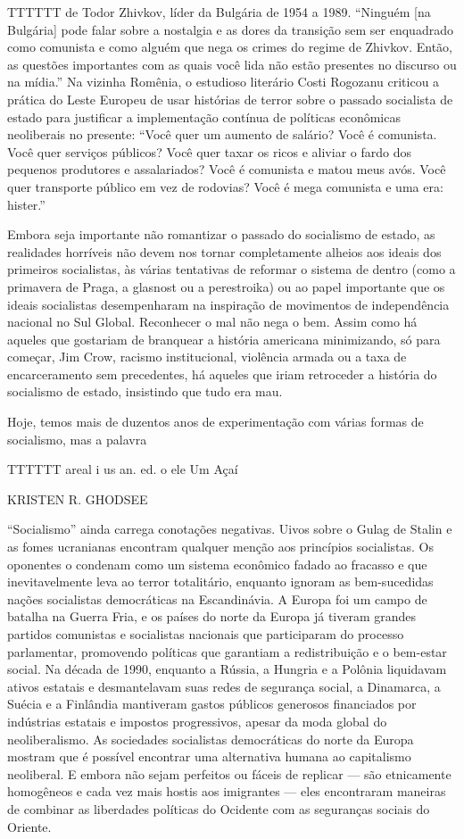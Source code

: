 TTTTTT de Todor Zhivkov, líder da Bulgária de 1954 a 1989. “Ninguém [na Bulgária] pode falar sobre a nostalgia e as dores da transição sem ser enquadrado como comunista e como alguém que nega os crimes do regime de Zhivkov. Então, as questões importantes com as quais você lida não estão presentes no discurso ou na mídia.” Na vizinha Romênia, o estudioso literário Costi Rogozanu criticou a prática do Leste Europeu de usar histórias de terror sobre o passado socialista de estado para justificar a implementação contínua de políticas econômicas neoliberais no presente: “Você quer um aumento de salário? Você é comunista. Você quer serviços públicos? Você quer taxar os ricos e aliviar o fardo dos pequenos produtores e assalariados? Você é comunista e matou meus avós. Você quer transporte público em vez de rodovias? Você é mega comunista e uma era: hister.”
 \par 
Embora seja importante não romantizar o passado do socialismo de estado, as realidades horríveis não devem nos tornar completamente alheios aos ideais dos primeiros socialistas, às várias tentativas de reformar o sistema de dentro (como a primavera de Praga, a glasnost ou a perestroika) ou ao papel importante que os ideais socialistas desempenharam na inspiração de movimentos de independência nacional no Sul Global. Reconhecer o mal não nega o bem. Assim como há aqueles que gostariam de branquear a história americana minimizando, só para começar, Jim Crow, racismo institucional, violência armada ou a taxa de encarceramento sem precedentes, há aqueles que iriam retroceder a história do socialismo de estado, insistindo que tudo era mau.
 \par 
Hoje, temos mais de duzentos anos de experimentação com várias formas de socialismo, mas a palavra
 \par 
TTTTTT areal i us an. ed. o ele Um Açaí
 \par 
KRISTEN R. GHODSEE
 \par 
“Socialismo” ainda carrega conotações negativas. Uivos sobre o Gulag de Stalin e as fomes ucranianas encontram qualquer menção aos princípios socialistas. Os oponentes o condenam como um sistema econômico fadado ao fracasso e que inevitavelmente leva ao terror totalitário, enquanto ignoram as bem-sucedidas nações socialistas democráticas na Escandinávia. A Europa foi um campo de batalha na Guerra Fria, e os países do norte da Europa já tiveram grandes partidos comunistas e socialistas nacionais que participaram do processo parlamentar, promovendo políticas que garantiam a redistribuição e o bem-estar social. Na década de 1990, enquanto a Rússia, a Hungria e a Polônia liquidavam ativos estatais e desmantelavam suas redes de segurança social, a Dinamarca, a Suécia e a Finlândia mantiveram gastos públicos generosos financiados por indústrias estatais e impostos progressivos, apesar da moda global do neoliberalismo. As sociedades socialistas democráticas do norte da Europa mostram que é possível encontrar uma alternativa humana ao capitalismo neoliberal. E embora não sejam perfeitos ou fáceis de replicar — são etnicamente homogêneos e cada vez mais hostis aos imigrantes — eles encontraram maneiras de combinar as liberdades políticas do Ocidente com as seguranças sociais do Oriente.
